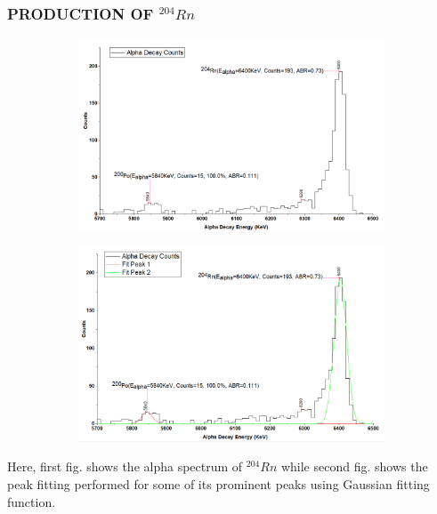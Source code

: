 \documentclass[12pt]{article}
\begin{document}
\subsubsection{PRODUCTION OF $^{204}Rn$}
\begin{figure}[h]
\centering
 \begin{subfigure}
\centering
\includegraphics[scale=0.5]{Rn204.png}
\end{subfigure}
\hfill
\begin{subfigure}
\centering
\includegraphics[scale=0.5]{Rn204(Peak Fitting).png}
\end{subfigure}
\label{First fig shows the alpha spectrum of Rn 204 and second fig shows the peak fitting for its prominent peaks.}
\end{figure}
Here, first fig. shows the alpha spectrum of $^{204}Rn$ while second fig. shows the peak fitting performed for some of its prominent peaks using Gaussian fitting function.
\clearpage
\end{document}
